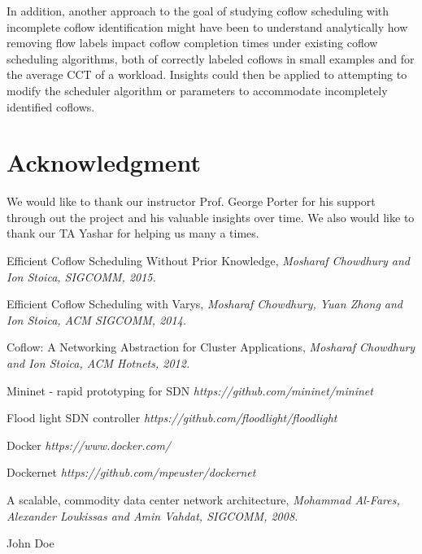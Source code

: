 \documentclass[conference]{IEEEtran}
\begin{document}
In addition, another approach to the goal of studying coflow scheduling with incomplete coflow identification might have been to understand analytically how removing flow labels impact coflow completion times under existing coflow scheduling algorithms, both of correctly labeled coflows in small examples and for the average CCT of a workload. Insights could then be applied to attempting to modify the scheduler algorithm or parameters to accommodate incompletely identified coflows.

\section*{Acknowledgment}
We would like to thank our instructor Prof. George Porter for his support through out the project and his valuable insights over time. We also would like to thank our TA Yashar for helping us many a times. 

\begin{thebibliography}{99}

Efficient Coflow Scheduling Without Prior Knowledge, 
\textit{Mosharaf Chowdhury and Ion Stoica, SIGCOMM, 2015.}

Efficient Coflow Scheduling with Varys, 
\textit{Mosharaf Chowdhury, Yuan Zhong and Ion Stoica, ACM SIGCOMM, 2014.}

Coflow: A Networking Abstraction for Cluster Applications, 
\textit{Mosharaf Chowdhury and Ion Stoica, ACM Hotnets, 2012.}

Mininet - rapid prototyping for SDN
\textit{https://github.com/mininet/mininet}

Flood light SDN controller
\textit{https://github.com/floodlight/floodlight}

Docker
\textit{https://www.docker.com/}

Dockernet
\textit{https://github.com/mpeuster/dockernet}

A scalable, commodity data center network architecture, 
\textit{Mohammad Al-Fares, Alexander Loukissas and Amin Vahdat, SIGCOMM, 2008.}

\end{thebibliography}


\begin{IEEEbiography}{John Doe}
\blindtext
\end{IEEEbiography}
\end{document}
